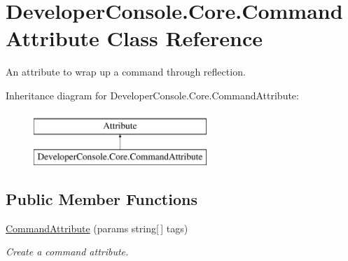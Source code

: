 \hypertarget{class_developer_console_1_1_core_1_1_command_attribute}{}\section{Developer\+Console.\+Core.\+Command\+Attribute Class Reference}
\label{class_developer_console_1_1_core_1_1_command_attribute}


An attribute to wrap up a command through reflection.  


Inheritance diagram for Developer\+Console.\+Core.\+Command\+Attribute\+:\begin{figure}[H]
\begin{center}
\leavevmode
\includegraphics[height=2.000000cm]{class_developer_console_1_1_core_1_1_command_attribute}
\end{center}
\end{figure}
\subsection*{Public Member Functions}
\begin{DoxyCompactItemize}
\item 
\hyperlink{class_developer_console_1_1_core_1_1_command_attribute_ae9cb1f0b092f9cbe43de9b28c3ba3620}{Command\+Attribute} (params string\mbox{[}$\,$\mbox{]} tags)
\begin{DoxyCompactList}\small\item\em Create a command attribute. \end{DoxyCompactList}\end{DoxyCompactItemize}
